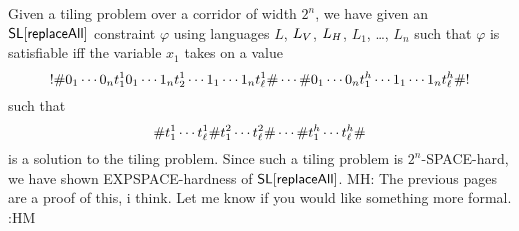 \documentclass{article}
\newcommand{\mat}[1]{\color{cyan} {MH: #1 :HM} \color{black}}
\begin{document}
Given a tiling problem over a corridor of width $2^n$, we have given an
$\strline[\replaceall]$
constraint $\varphi$ using languages
$L$, $L_\vcons$, $L_\hcons$, $L_1$, \ldots, $L_n$
such that $\varphi$ is satisfiable iff the variable $x_1$ takes on a value
\[
    \resetchar
    \rowdelim \nbit{1}{0} \cdots \nbit{n}{0} \tile^1_1
              \nbit{1}{0} \cdots \nbit{n}{1} \tile^1_2
              \cdots
              \nbit{1}{1} \cdots \nbit{n}{1} \tile^1_\width
    \rowdelim \cdots
    \rowdelim \nbit{1}{0} \cdots \nbit{n}{0} \tile^\height_1
              \cdots
              \nbit{1}{1} \cdots \nbit{n}{1} \tile^\height_\width
    \rowdelim
    \resetchar
\]
such that
\[
    \rowdelim \tile^1_1 \cdots \tile^1_\width
    \rowdelim \tile^2_1 \cdots \tile^2_\width
    \rowdelim \cdots
    \rowdelim \tile^\height_1 \cdots \tile^\height_\width
    \rowdelim
\]
is a solution to the tiling problem.
Since such a tiling problem is $2^n$-SPACE-hard, we have shown EXPSPACE-hardness of
$\strline[\replaceall]$.
\mat{
    The previous pages are a proof of this, i think.
    Let me know if you would like something more formal.
}
\end{document}
